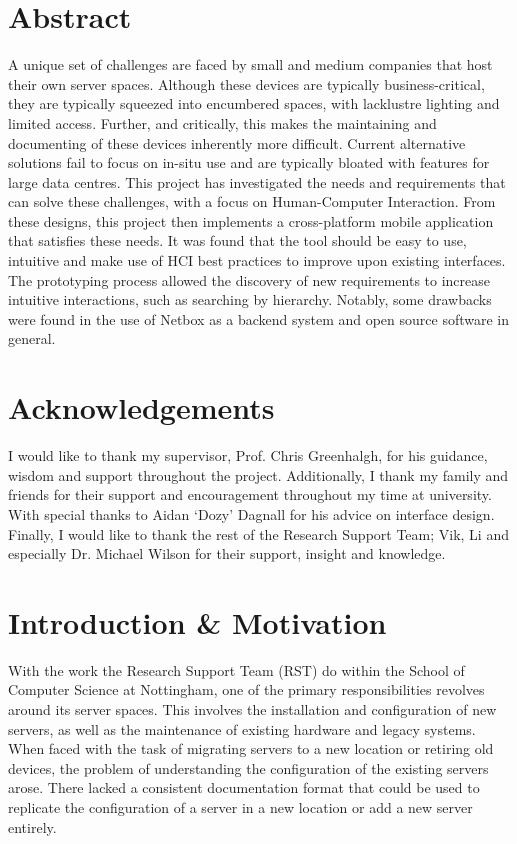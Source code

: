 \documentclass [11pt,a4paper]{article}
\begin{document}
\pagebreak

\section*{Abstract}
    \noindent
    A unique set of challenges are faced by small and medium companies that host their own server spaces. Although these devices are typically business-critical, they are typically squeezed into encumbered spaces, with lacklustre lighting and limited access. Further, and critically, this makes the maintaining and documenting of these devices inherently more difficult. Current alternative solutions fail to focus on in-situ use and are typically bloated with features for large data centres. This project has investigated the needs and requirements that can solve these challenges, with a focus on Human-Computer Interaction. From these designs, this project then implements a cross-platform mobile application that satisfies these needs. It was found that the tool should be easy to use, intuitive and make use of HCI best practices to improve upon existing interfaces. The prototyping process allowed the discovery of new requirements to increase intuitive interactions, such as searching by hierarchy. Notably, some drawbacks were found in the use of Netbox as a backend system and open source software in general.  

\section*{Acknowledgements}
    \noindent
    I would like to thank my supervisor, Prof. Chris Greenhalgh, for his guidance, wisdom and support throughout the project. Additionally, I thank my family and friends for their support and encouragement throughout my time at university. With special thanks to Aidan `Dozy' Dagnall for his advice on interface design.
    Finally, I would like to thank the rest of the Research Support Team; Vik, Li and especially Dr. Michael Wilson for their support, insight and knowledge.

\pagebreak

\tableofcontents
\pagebreak 
{}    

\setlength{\parskip}{2ex}

\section{Introduction \& Motivation}
\label{sec:introduction}
With the work the Research Support Team (RST) do within the School of Computer Science at Nottingham, one of the primary responsibilities revolves around its server spaces. This involves the installation and configuration of new servers, as well as the maintenance of existing hardware and legacy systems. When faced with the task of migrating servers to a new location or retiring old devices, the problem of understanding the configuration of the existing servers arose. There lacked a consistent documentation format that could be used to replicate the configuration of a server in a new location or add a new server entirely.
\end{document}
